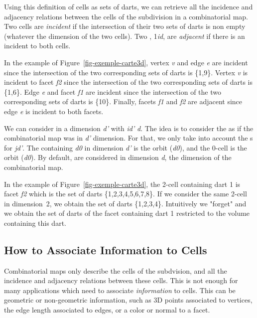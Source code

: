 Using this definition of cells as sets of darts, we can retrieve all the
incidence and adjacency relations between the cells of the subdivision
in a combinatorial map.  Two cells are \emph{incident} if the
intersection of their two sets of darts is non empty (whatever the
dimension of the two cells). Two , 1\myleq{}\emph{i}\myleq{}\emph{d}, are
\emph{adjacent} if there is an  incident to both cells.

In the example of Figure~\ref{fig-exemple-carte3d}, vertex \emph{v} and
edge \emph{e} are incident since the intersection of the two corresponding
sets of darts is \{1,9\}\myneq{}\myemptyset{}. Vertex \emph{v} is incident to facet
\emph{f2} since the intersection of the two corresponding sets of darts is
\{1,6\}\myneq{}\myemptyset{}. Edge \emph{e} and facet \emph{f1} are incident
since the intersection of the two corresponding sets of darts is
\{10\}\myneq{}\myemptyset{}. Finally, facets \emph{f1} and \emph{f2} are adjacent
since edge \emph{e} is incident to both facets.

We can consider  in a dimension \emph{d'} with  \emph{i}\myleq{}\emph{d'}\myleq{}
\emph{d}. The idea is to consider the  as if the combinatorial map
was in \emph{d'} dimension. For that, we only take into account the
\betaj{}s for \emph{j}\myleq{}\emph{d'}.  The  containing \emph{d0} in dimension
\emph{d'} is the orbit
\orbit{\betaun{},\myldots{},\betaimun{},\betaipun{},\myldots{},\betadprim{}}(\emph{d0}), and 
the 0-cell is the orbit (\emph{d0}).  By default,  are considered in
dimension \emph{d}, the dimension of the combinatorial map.

In the example of Figure~\ref{fig-exemple-carte3d}, the 2-cell
containing dart 1 is facet \emph{f2} which is the set of darts
\{1,2,3,4,5,6,7,8\}. If we consider the same 2-cell in dimension~2,
we obtain the set of darts \{1,2,3,4\}. Intuitively we "forget"
\betatrois{} and we obtain the set of darts of the facet containing dart
1 restricted to the volume containing this dart.

\subsection{How to Associate Information to Cells}
\label{ssec-associate-attributes}
Combinatorial maps only describe the cells of the subdvision, and all
the incidence and adjacency relations between these cells. This is not
enough for many applications which need to associate
\emph{information} to cells.  This can be geometric or non-geometric
information, such as 3D points associated to vertices, the edge length
associated to edges, or a color or normal to a facet.

